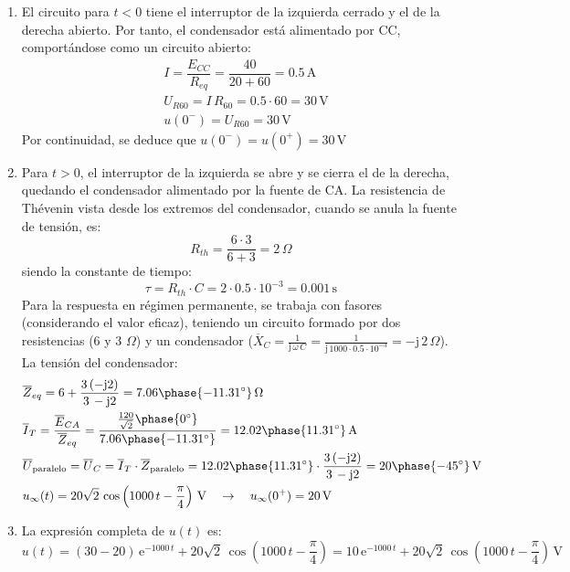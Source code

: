\begin{enumerate}
    \item El circuito para $t<0$ tiene el interruptor de la izquierda cerrado y el de la derecha abierto. Por tanto, el condensador está alimentado por CC, comportándose como un circuito abierto:
    \begin{align*}
        &I=\dfrac{E_{CC}}{R_{eq}}=\dfrac{40}{20+60}=0.5\,\si{\ampere}\\
        &U_{R60}=I\,R_{60}=0.5\cdot 60=30\,\si{\volt}\\
        &u(0^-)=U_{R60}=30\,\si{\volt}
    \end{align*}
    Por continuidad, se deduce que $u(0^-)=u(0^+)=30\,\si{\volt}$ 
    \item Para $t>0$, el interruptor de la izquierda se abre y se cierra el de la derecha, quedando el condensador alimentado por la fuente de CA. 
    La resistencia de Thévenin vista desde los extremos del condensador, cuando se anula la fuente de tensión, es:
    \begin{equation*}
        R_{th}=\dfrac{6\cdot 3}{6+3}=2\,\Omega
    \end{equation*}
    siendo la constante de tiempo:
    \begin{equation*}
        \tau=R_{th}\cdot C=2\cdot0.5\cdot10^{-3}=0.001\,\si{\second}
    \end{equation*}
    Para la respuesta en régimen permanente, se trabaja con fasores (considerando el valor eficaz), teniendo un circuito formado por dos resistencias (6 y 3 $\Omega$) y un condensador ($\overline{X}_C=\frac{1}{\mathrm{j}\,\omega\,C}=\frac{1}{\mathrm{j}\,1000\cdot 0.5\cdot 10^{-3}}=-\mathrm{j}\,2\,\Omega$). La tensión del condensador:
    \begin{align*}
        &\overline{Z}_{eq}=6+\dfrac{3\,(-\mathrm{j}2)}{3\,-\mathrm{j}2}=7.06\phase{-11.31^\circ}\,\Omega\\
        &\overline{I}_T=\dfrac{\overline{E}_{CA}}{\overline{Z}_{eq}}=\dfrac{\frac{120}{\sqrt{2}}\phase{0^\circ}}{7.06\phase{-11.31^\circ}}=12.02\phase{11.31^\circ} \,\si{\ampere}\\
        &\overline{U}_{\textrm{paralelo}}=\overline{U}_C=\overline{I}_T\cdot\overline{Z}_{\textrm{paralelo}}=12.02\phase{11.31^\circ}\cdot \dfrac{3\,(-\mathrm{j}2)}{3\,-\mathrm{j}2}=20\phase{-45^\circ}\,\si{\volt}\\
        &u_\infty(t)=20\sqrt{2}\,\cos\left(1000\,t-\frac{\pi}{4}\right)\,\si{\volt} \quad\rightarrow\quad u_\infty(0^+)=20\,\si{\volt}
    \end{align*}
    \item La expresión completa de $u(t)$ es:
    \begin{equation*}
        u(t)=\left(30-20 \right)\,\mathrm{e}^{-1000\,t}+20\sqrt{2}\,\cos\left(1000\,t-\frac{\pi}{4}\right)=10\,\mathrm{e}^{-1000\,t}+20\sqrt{2}\,\cos\left(1000\,t-\frac{\pi}{4}\right)\,\si{\volt}
    \end{equation*}
\end{enumerate}


